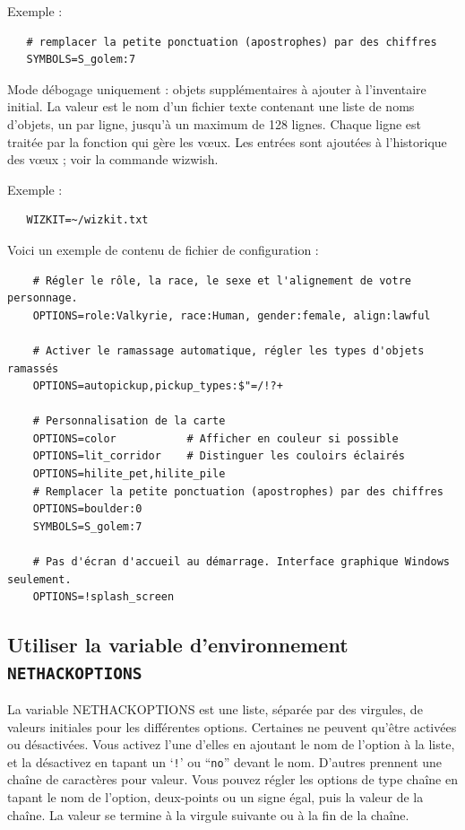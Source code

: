 \documentclass[titlepage]{article}
\begin{document}
\begin{description}
Exemple :
\begin{verbatim}
   # remplacer la petite ponctuation (apostrophes) par des chiffres
   SYMBOLS=S_golem:7
\end{verbatim}

\item[WIZKIT]
Mode débogage uniquement : objets supplémentaires à ajouter à l'inventaire initial.
La valeur est le nom d'un fichier texte contenant une liste de noms d'objets,
un par ligne, jusqu'à un maximum de 128 lignes.
Chaque ligne est traitée par la fonction qui gère les vœux.
Les entrées sont ajoutées à l'historique des vœux ; voir la commande wizwish.

Exemple :
\begin{verbatim}
   WIZKIT=~/wizkit.txt
\end{verbatim}
\end{description}

Voici un exemple de contenu de fichier de configuration :
\begin{verbatim}
    # Régler le rôle, la race, le sexe et l'alignement de votre personnage.
    OPTIONS=role:Valkyrie, race:Human, gender:female, align:lawful

    # Activer le ramassage automatique, régler les types d'objets ramassés
    OPTIONS=autopickup,pickup_types:$"=/!?+

    # Personnalisation de la carte
    OPTIONS=color           # Afficher en couleur si possible
    OPTIONS=lit_corridor    # Distinguer les couloirs éclairés
    OPTIONS=hilite_pet,hilite_pile
    # Remplacer la petite ponctuation (apostrophes) par des chiffres
    OPTIONS=boulder:0
    SYMBOLS=S_golem:7

    # Pas d'écran d'accueil au démarrage. Interface graphique Windows seulement.
    OPTIONS=!splash_screen
\end{verbatim}

\subsection*{Utiliser la variable d'environnement \texttt{NETHACKOPTIONS}}

La variable NETHACKOPTIONS est une liste, séparée par des virgules, de valeurs
initiales pour les différentes options. Certaines ne peuvent qu'être activées ou désactivées.
Vous activez l'une d'elles en ajoutant le nom de l'option à la liste,
et la désactivez en tapant un `\texttt{!}' ou ``\texttt{no}'' devant le nom.
D'autres prennent une
chaîne de caractères pour valeur. Vous pouvez régler les options de type chaîne en tapant
le nom de l'option, deux-points ou un signe égal, puis la valeur de la chaîne.
La valeur se termine à la virgule suivante ou à la fin de la chaîne.
\end{document}
